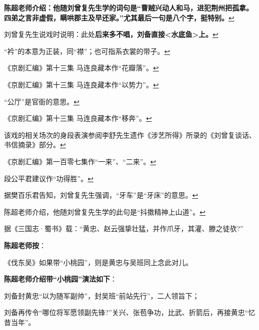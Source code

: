   \textbf{陈超老师介绍：他随刘曾复先生学的词句是``曹贼兴动人和马，进犯荆州把孤拿。四弟之言非虚假，瞒哄郡主及早还家。''尤其最后一句是八个字，挺特别。}\protect\hyperlink{fnref188}{↩}
\item
  \leavevmode\hypertarget{fn189}{}%
  刘曾复先生说戏时说明：此处\textbf{后来多不唱，刘备直接\textless{}水底鱼\textgreater{}上。}\protect\hyperlink{fnref189}{↩}
\item
  \leavevmode\hypertarget{fn190}{}%
  ``衿''的本意为正装，同``襟''；也可指系衣裳的带子。\protect\hyperlink{fnref190}{↩}
\item
  \leavevmode\hypertarget{fn191}{}%
  《京剧汇编》第十三集
  马连良藏本作``花瓣落''。\protect\hyperlink{fnref191}{↩}
\item
  \leavevmode\hypertarget{fn192}{}%
  《京剧汇编》第十三集
  马连良藏本作``以势力''。\protect\hyperlink{fnref192}{↩}
\item
  \leavevmode\hypertarget{fn193}{}%
  ``公厅''是官衙的意思。\protect\hyperlink{fnref193}{↩}
\item
  \leavevmode\hypertarget{fn194}{}%
  《京剧汇编》第十三集
  马连良藏本作``移奔''。\protect\hyperlink{fnref194}{↩}
\item
  \leavevmode\hypertarget{fn195}{}%
  该戏的相关场次的身段表演参阅李舒先生遗作《涉艺所得》所录的《刘曾复谈话、书信摘录》部分。\protect\hyperlink{fnref195}{↩}
\item
  \leavevmode\hypertarget{fn196}{}%
  《京剧汇编》第一百零七集作``一来''、``二来''。\protect\hyperlink{fnref196}{↩}
\item
  \leavevmode\hypertarget{fn197}{}%
  段公平君建议作``功得胜''。\protect\hyperlink{fnref197}{↩}
\item
  \leavevmode\hypertarget{fn198}{}%
  据樊百乐君告知，刘曾复先生强调，``牙车''是``牙床''的意思。\protect\hyperlink{fnref198}{↩}
\item
  \leavevmode\hypertarget{fn199}{}%
  陈超老师介绍，他随刘曾复先生学的此句是``抖擞精神上山道''。\protect\hyperlink{fnref199}{↩}
\item
  \leavevmode\hypertarget{fn200}{}%
  据《三国志·蜀书》载：``黄忠、赵云强挚壮猛，并作爪牙，其灌、滕之徒欤?''

  \textbf{陈超老师按}：

  《伐东吴》如果带``小桃园''，则是黄忠与吴班同上念此对儿。

  \textbf{陈超老师介绍带``小桃园''演法如下}：

  刘备封黄忠``以为随军副帅''，封吴班``前站先行''，二人领旨下；

  刘备再传令``哪位将军愿领副先锋?''关兴、张苞争功，比武、折箭后，再接黄忠``忆昔当年''。


